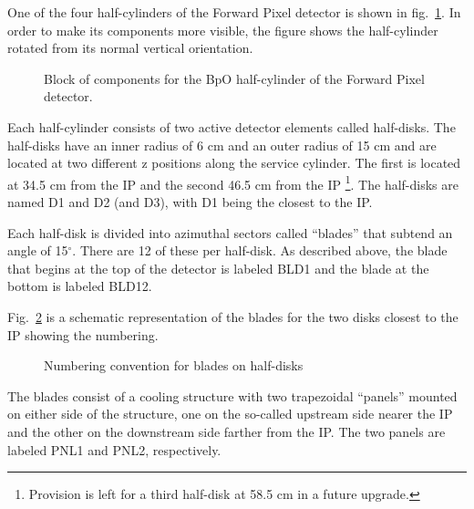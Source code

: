 \documentclass{cmspaper}
\begin{document}
One of the four half-cylinders of the Forward Pixel detector is shown in fig.~\ref{figure:FPix}.
In order to make its components more visible, the figure shows the half-cylinder rotated 
from its normal vertical orientation.

\begin{figure}[hbtp] 
 \begin{center} 
    \caption{Block of components for the BpO half-cylinder of the 
  Forward Pixel detector.    \label{figure:FPix} }
   \end{center} 
\end{figure} 


Each half-cylinder consists of two active detector elements called half-disks.
The half-disks  have an inner radius of 6 cm and an outer radius of 15 cm
and are located at two different z positions along the service cylinder.
The first is located at 34.5 cm from the IP and the second 46.5 cm from the IP
\footnote{Provision is left for a third half-disk at 58.5 cm in a future upgrade.}. 
The half-disks are named D1 and D2 (and D3), with D1 being the closest to the IP. 

Each half-disk is divided into azimuthal sectors called ``blades'' that subtend
an angle of 15$^{\circ}$. There are 12 of these per half-disk. As described 
above, the blade that  begins at the top of the detector is labeled
BLD1 and the blade at the bottom is labeled BLD12. 

Fig.~\ref{figure:azimuthal_numbering} is a schematic representation of the 
blades for the two disks closest to the IP showing the numbering.

\begin{figure}[hbtp]
  \begin{center}
    \caption{Numbering convention for blades on half-disks}
    \label{figure:azimuthal_numbering}
  \end{center}
\end{figure}

The blades consist of a cooling structure with two 
trapezoidal ``panels'' mounted on either side of the structure, 
one on the so-called upstream side nearer the IP and the other on the downstream side farther from the IP. 
The two panels are labeled PNL1 and PNL2, respectively. 
\end{document}
